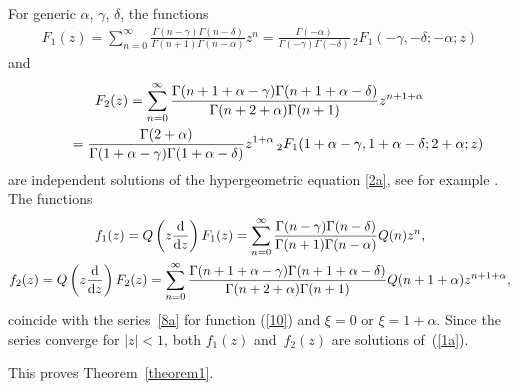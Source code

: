For generic $\alpha$, $\gamma$, $\delta$, the functions
\begin{gather*}
F_1(z) = \sum_{n=0}^\infty \frac{\Gamma(n-\gamma) \Gamma(n-\delta)}{\Gamma(n+1) \Gamma(n-\alpha)} z^n = \frac{\Gamma(-\alpha)}{\Gamma(-\gamma) \Gamma(-\delta)} \,{}_2F_1(-\gamma,-\delta;-\alpha;z)
\end{gather*}
and
\begin{gather*}
F_2(z)= \sum_{n=0}^\infty
\frac{\Gamma(n+1+\alpha-\gamma) \Gamma(n+1+\alpha-\delta)} {\Gamma(n+2+\alpha) \Gamma(n+1)} z^{n+1+\alpha}\\
\hphantom{F_2(z)}{} = \frac{\Gamma(2+\alpha)} {\Gamma(1+\alpha-\gamma) \Gamma(1+\alpha-\delta)} z^{1+\alpha} \, {}_2F_1(1+\alpha-\gamma,1+\alpha-\delta;2+\alpha;z)
\end{gather*}
are independent solutions of the hypergeometric equation \eqref{2a}, see for example \cite{Mellin}. The functions
\begin{gather*}
f_1(z) = Q\left({z\frac{{\rm d}}{{\rm d}z}}\right) F_1(z) = \sum_{n=0}^\infty \frac{\Gamma(n-\gamma) \Gamma(n-\delta)}{\Gamma(n+1) \Gamma(n-\alpha)} Q(n) z^n,\\
f_2(z) = Q\left({z\frac{{\rm d}}{{\rm d}z}}\right) F_2(z) = \sum_{n=0}^\infty\frac{\Gamma(n+1+\alpha-\gamma) \Gamma(n+1+\alpha-\delta)}{\Gamma(n+2+\alpha) \Gamma(n+1)} Q(n+1+\alpha) z^{n+1+\alpha},
\end{gather*}
coincide with the series~\eqref{8a} for function (\ref{10}) and $\xi=0$ or $\xi=1+\alpha$. Since the series converge for $|z|<1$, both $f_1(z)$ and~$f_2(z)$ are solutions of~(\ref{1a}).

This proves Theorem~\ref{theorem1}.

